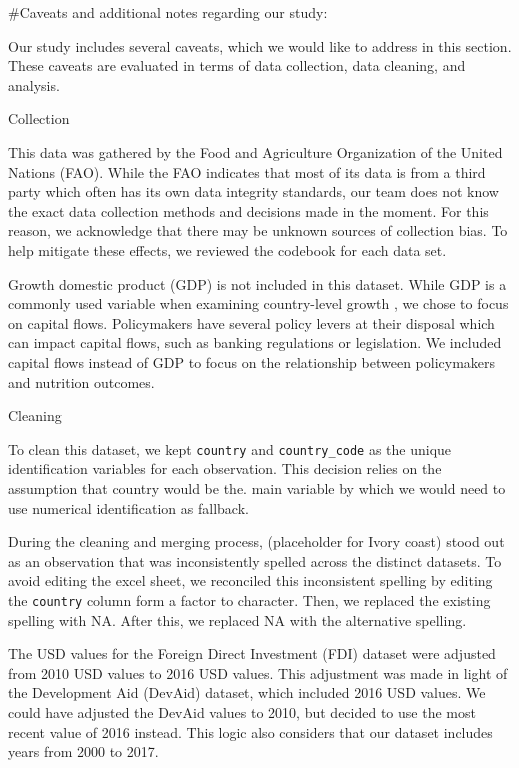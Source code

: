 \documentclass[
]{article}
\begin{document}
\#Caveats and additional notes regarding our study:

Our study includes several caveats, which we would like to address in
this section. These caveats are evaluated in terms of data collection,
data cleaning, and analysis.

Collection

This data was gathered by the Food and Agriculture Organization of the
United Nations (FAO). While the FAO indicates that most of its data is
from a third party which often has its own data integrity standards, our
team does not know the exact data collection methods and decisions made
in the moment. For this reason, we acknowledge that there may be unknown
sources of collection bias. To help mitigate these effects, we reviewed
the codebook for each data set.

Growth domestic product (GDP) is not included in this dataset. While GDP
is a commonly used variable when examining country-level growth , we
chose to focus on capital flows. Policymakers have several policy levers
at their disposal which can impact capital flows, such as banking
regulations or legislation. We included capital flows instead of GDP to
focus on the relationship between policymakers and nutrition outcomes.

Cleaning

To clean this dataset, we kept \texttt{country} and
\texttt{country\_code} as the unique identification variables for each
observation. This decision relies on the assumption that country would
be the. main variable by which we would need to use numerical
identification as fallback.

During the cleaning and merging process, (placeholder for Ivory coast)
stood out as an observation that was inconsistently spelled across the
distinct datasets. To avoid editing the excel sheet, we reconciled this
inconsistent spelling by editing the \texttt{country} column form a
factor to character. Then, we replaced the existing spelling with NA.
After this, we replaced NA with the alternative spelling.

The USD values for the Foreign Direct Investment (FDI) dataset were
adjusted from 2010 USD values to 2016 USD values. This adjustment was
made in light of the Development Aid (DevAid) dataset, which included
2016 USD values. We could have adjusted the DevAid values to 2010, but
decided to use the most recent value of 2016 instead. This logic also
considers that our dataset includes years from 2000 to 2017.
\end{document}
